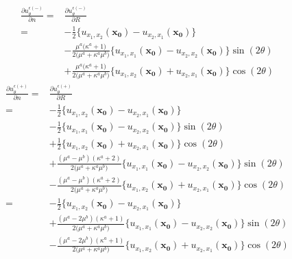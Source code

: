 \begin{align}
	\frac{\partial u_{\theta}^{\epsilon(-)}}{\partial n}
	=&\frac{\partial u_{\theta}^{\epsilon(-)}}{\partial R}
	\nonumber
	\\
	=&-\frac{1}{2}\bigl\{u_{x_{1},x_{2}}(\bm{x_{0}})-u_{x_{2},x_{1}}(\bm{x_{0}})\bigr\}
	\nonumber
	\\
	&-\frac{\mu^{a}\bigl(\kappa^{a}+1\bigr)}{2\bigl(\mu^{a}+\kappa^{a}\mu^{b}\bigr)}
	\bigl\{u_{x_{1},x_{1}}(\bm{x_{0}})-u_{x_{2},x_{2}}(\bm{x_{0}})\bigr\}\sin(2\theta)
	\nonumber
	\\
	&+\frac{\mu^{a}\bigl(\kappa^{a}+1\bigr)}{2\bigl(\mu^{a}+\kappa^{a}\mu^{b}\bigr)}
	\bigl\{u_{x_{1},x_{2}}(\bm{x_{0}})+u_{x_{2},x_{1}}(\bm{x_{0}})\bigr\}\cos(2\theta)
	\label{eq:eRRInEpsSol}
\end{align}
\begin{align}
	\frac{\partial u_{\theta}^{\epsilon(+)}}{\partial n}
	=&\frac{\partial u_{\theta}^{\epsilon(+)}}{\partial R}
	\nonumber
	\\
	=&-\frac{1}{2}\bigl\{u_{x_{1},x_{2}}(\bm{x_{0}})-u_{x_{2},x_{1}}(\bm{x_{0}})\bigr\}
	\nonumber
	\\
	&-\frac{1}{2}\bigl\{u_{x_{1},x_{1}}(\bm{x_{0}})-u_{x_{2},x_{2}}(\bm{x_{0}})\bigr\}\sin(2\theta)
	\nonumber
	\\
	&+\frac{1}{2}\bigl\{u_{x_{1},x_{2}}(\bm{x_{0}})+u_{x_{2},x_{1}}(\bm{x_{0}})\bigr\}\cos(2\theta)
	\nonumber
	\\
	&+\frac{(\mu^{a}-\mu^{b})(\kappa^{a}+2)}{2\bigl(\mu^{a}+\kappa^{a}\mu^{b}\bigr)}
	\bigl\{u_{x_{1},x_{1}}(\bm{x_{0}})-u_{x_{2},x_{2}}(\bm{x_{0}})\bigr\}\sin(2\theta)
	\nonumber
	\\
	&-\frac{(\mu^{a}-\mu^{b})(\kappa^{a}+2)}{2\bigl(\mu^{a}+\kappa^{a}\mu^{b}\bigr)}
	\bigl\{u_{x_{1},x_{2}}(\bm{x_{0}})+u_{x_{2},x_{1}}(\bm{x_{0}})\bigr\}\cos(2\theta)
	\nonumber
	\\
	=&-\frac{1}{2}\bigl\{u_{x_{1},x_{2}}(\bm{x_{0}})-u_{x_{2},x_{1}}(\bm{x_{0}})\bigr\}
	\nonumber
	\\
	&+\frac{(\mu^{a}-2\mu^{b})(\kappa^{a}+1)}{2\bigl(\mu^{a}+\kappa^{a}\mu^{b}\bigr)}
	\bigl\{u_{x_{1},x_{1}}(\bm{x_{0}})-u_{x_{2},x_{2}}(\bm{x_{0}})\bigr\}\sin(2\theta)
	\nonumber
	\\
	&-\frac{(\mu^{a}-2\mu^{b})(\kappa^{a}+1)}{2\bigl(\mu^{a}+\kappa^{a}\mu^{b}\bigr)}
	\bigl\{u_{x_{1},x_{2}}(\bm{x_{0}})+u_{x_{2},x_{1}}(\bm{x_{0}})\bigr\}\cos(2\theta)
	\label{eq:eRROutEpsSol}
\end{align}

